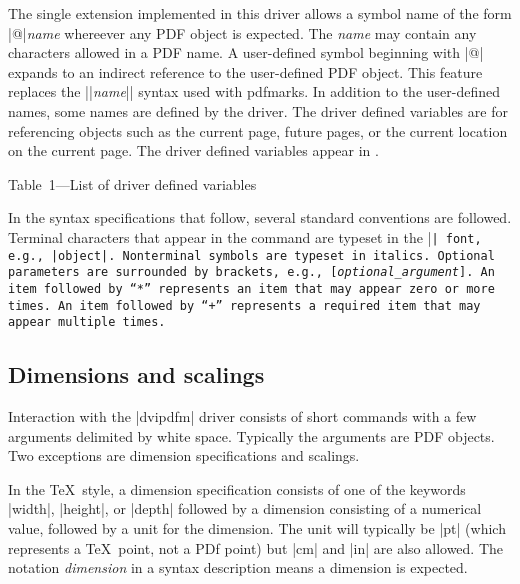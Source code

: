 The single extension implemented in this driver
allows a symbol name of the
form |@|{\it name} whereever any PDF object is expected.
The {\it name} may contain any characters allowed
in a PDF name.
A user-defined symbol beginning with |@| expands to an indirect
reference to the user-defined PDF object.  This feature replaces
the |{|{\it name}|}| syntax used with pdfmarks.
In addition to the user-defined names, some names
are defined by the driver.
The driver defined variables are for
referencing objects such as the current page, future pages,
or the current location on the current page.
The driver defined variables appear in .
\topinsert
{}
\centerline{\begincolor{\blue}\subheadingfont Table~1---List of driver
defined variables\endcolor}
\bigskip\nobreak
\centerline{\vbox{}}
\endinsert

In the syntax specifications that follow, several
standard conventions are followed.  Terminal
characters that appear in the command 
are typeset in the |\tt| font, e.g., |object|.
Nonterminal symbols are typeset in italics.
Optional parameters are surrounded by brackets, e.g.,
[{\it optional\_argument}].  An item followed
by~``{*}'' represents an item that may appear
zero or more times.  An item followed by~``{+}''
represents a required item that may appear multiple times.

\subsection{Dimensions and scalings}
Interaction with the |dvipdfm| driver consists
of short commands with a few arguments delimited by white space.
Typically the arguments are PDF objects.
Two exceptions are dimension specifications and scalings.

In the \TeX\ style, a dimension specification consists of one of the keywords
|width|, |height|, or |depth| followed by a dimension
consisting of a numerical value, followed by a unit for the dimension.  The
unit will typically be |pt| (which represents a \TeX\ point, not a
PDf point) but |cm| and |in| are also allowed.  The notation
{\it dimension\/} in a syntax description means a dimension is expected.

